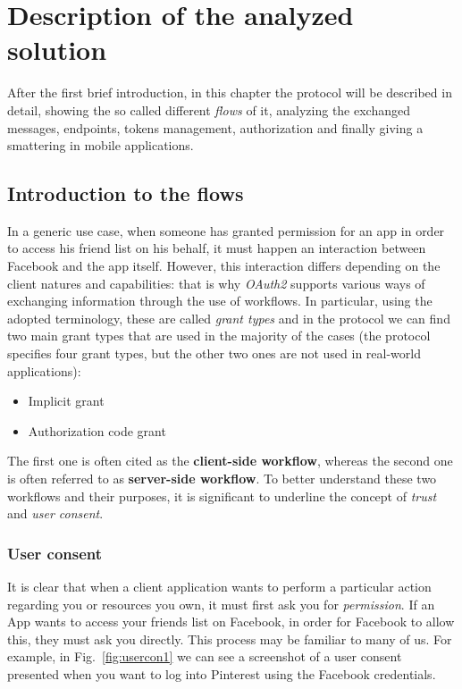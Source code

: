 \chapter{Description of the analyzed solution}
After the first brief introduction, in this chapter the protocol will be described in detail, showing the so called different \textit{flows} of it, analyzing the exchanged messages, endpoints, tokens management, authorization and finally giving a smattering in mobile applications.
\minitoc

\section{Introduction to the flows}\label{section22}
In a generic use case, when someone has granted permission for an app in order to access his friend list on his behalf, it must happen an interaction between Facebook and the app itself. However, this interaction differs depending on the client natures and capabilities: that is why \textit{OAuth2} supports various ways of exchanging information through the use of workflows.
In particular, using the adopted terminology, these are called \textit{grant types} and in the protocol we can find two main grant types that are used in the majority of the cases (the protocol specifies four grant types, but the other two ones are not used in real-world applications):

\begin{itemize}
    \item Implicit grant
    \item Authorization code grant
\end{itemize}

The first one is often cited as the \textbf{client-side workflow}, whereas the second one is often referred to as \textbf{server-side workflow}.
To better understand these two workflows and their purposes, it is significant to underline the concept of \textit{trust} and \textit{user consent}.

\subsection{User consent}
It is clear that when a client application wants to perform a particular action regarding you or resources you own, it must first ask you for \textit{permission}. If an App wants to access your friends list on Facebook, in order for Facebook to allow this, they must ask you directly. This process may be familiar to many of us. For example, in Fig.~\ref{fig:usercon1} we can see a screenshot of a user consent presented when you want to log into Pinterest using the Facebook credentials.

